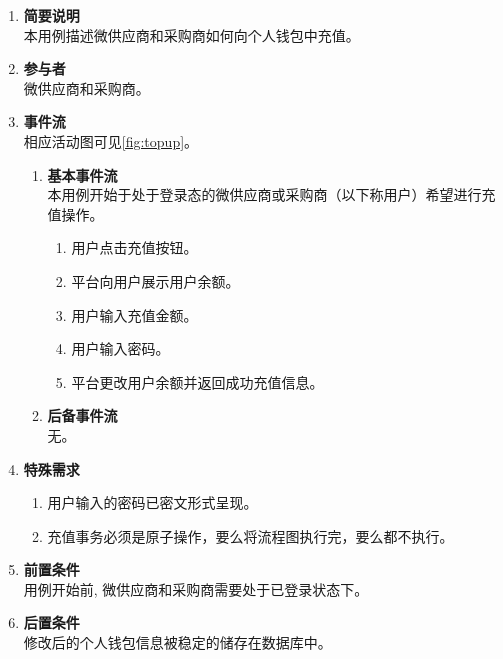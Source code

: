 \begin{enumerate}
	\item \textbf{简要说明}  \\ 本用例描述微供应商和采购商如何向个人钱包中充值。
	\item \textbf{参与者} \\ 微供应商和采购商。
	\item \textbf{事件流} \\ 相应活动图可见\autoref{fig:topup}。
	\begin{enumerate} 
        \item \textbf{基本事件流} \\ 本用例开始于处于登录态的微供应商或采购商（以下称用户）希望进行充值操作。
        \begin{enumerate}
            \item 用户点击充值按钮。
            \item 平台向用户展示用户余额。
            \item 用户输入充值金额。
            \item 用户输入密码。
            \item 平台更改用户余额并返回成功充值信息。
        \end{enumerate}
        \item \textbf{后备事件流} \\
            无。
    \end{enumerate}
    \item \textbf{特殊需求}
    \begin{enumerate}
        \item 用户输入的密码已密文形式呈现。
        \item 充值事务必须是原子操作，要么将流程图执行完，要么都不执行。
    \end{enumerate}
    \item \textbf{前置条件} \\ 用例开始前, 微供应商和采购商需要处于已登录状态下。
    \item \textbf{后置条件} \\ 修改后的个人钱包信息被稳定的储存在数据库中。 
\end{enumerate}


